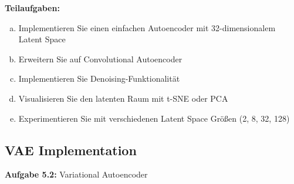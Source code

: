 \documentclass[12pt,a4paper]{article}
\begin{document}
\textbf{Teilaufgaben:}
\begin{enumerate}[(a)]
    \item Implementieren Sie einen einfachen Autoencoder mit 32-dimensionalem Latent Space
    \item Erweitern Sie auf Convolutional Autoencoder
    \item Implementieren Sie Denoising-Funktionalität
    \item Visualisieren Sie den latenten Raum mit t-SNE oder PCA
    \item Experimentieren Sie mit verschiedenen Latent Space Größen (2, 8, 32, 128)
\end{enumerate}

\subsection{VAE Implementation}

\textbf{Aufgabe 5.2:} Variational Autoencoder
\end{document}
